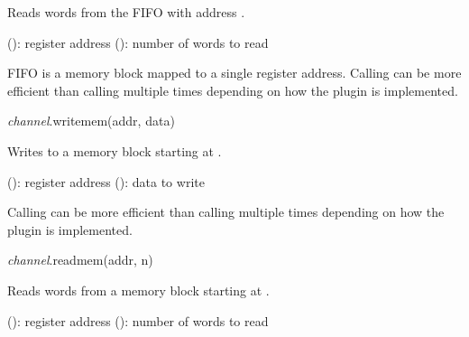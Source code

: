 \documentclass[a4paper,12pt,twoside,extrafontsizes]{memoir}
\begin{document}
\begin{funcdescr}
	Reads  words from the FIFO with address .
\end{funcdescr}

\begin{funcparams}
	 (): register address
	 (): number of words to read
\end{funcparams}

\begin{funcremarks}
	FIFO is a memory block mapped to a single register address. Calling  can be more efficient than calling  multiple times depending on how the plugin is implemented.
\end{funcremarks}


\begin{luafuncprototype}
\emph{channel}.writemem(addr, data)
\end{luafuncprototype}

\begin{funcdescr}
	Writes  to a memory block starting at .
\end{funcdescr}

\begin{funcparams}
	 (): register address
	 (): data to write
\end{funcparams}

\begin{funcremarks}
	Calling  can be more efficient than calling  multiple times depending on how the plugin is implemented.
\end{funcremarks}


\begin{luafuncprototype}
\emph{channel}.readmem(addr, n)
\end{luafuncprototype}

\begin{funcdescr}
	Reads  words from a memory block starting at .
\end{funcdescr}

\begin{funcparams}
	 (): register address
	 (): number of words to read
\end{funcparams}
\end{document}
